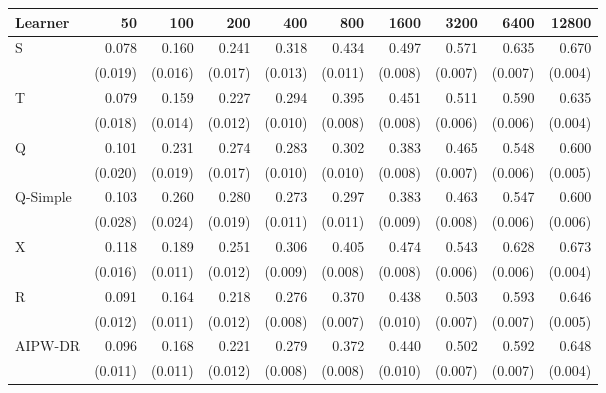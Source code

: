 \begin{tabular}{l|rrrrrrrrr}
\hline
Learner & 50 & 100 & 200 & 400 & 800 & 1600 & 3200 & 6400 & 12800 \\
\hline
S & 0.078 & 0.160 & 0.241 & 0.318 & 0.434 & 0.497 & 0.571 & 0.635 & 0.670 \\
 & \scriptsize (0.019) & \scriptsize (0.016) & \scriptsize (0.017) & \scriptsize (0.013) & \scriptsize (0.011) & \scriptsize (0.008) & \scriptsize (0.007) & \scriptsize (0.007) & \scriptsize (0.004) \\[2pt]
T & 0.079 & 0.159 & 0.227 & 0.294 & 0.395 & 0.451 & 0.511 & 0.590 & 0.635 \\
 & \scriptsize (0.018) & \scriptsize (0.014) & \scriptsize (0.012) & \scriptsize (0.010) & \scriptsize (0.008) & \scriptsize (0.008) & \scriptsize (0.006) & \scriptsize (0.006) & \scriptsize (0.004) \\[2pt]
\hline
Q & 0.101 & 0.231 & 0.274 & 0.283 & 0.302 & 0.383 & 0.465 & 0.548 & 0.600 \\
 & \scriptsize (0.020) & \scriptsize (0.019) & \scriptsize (0.017) & \scriptsize (0.010) & \scriptsize (0.010) & \scriptsize (0.008) & \scriptsize (0.007) & \scriptsize (0.006) & \scriptsize (0.005) \\[2pt]
Q-Simple & 0.103 & 0.260 & 0.280 & 0.273 & 0.297 & 0.383 & 0.463 & 0.547 & 0.600 \\
 & \scriptsize (0.028) & \scriptsize (0.024) & \scriptsize (0.019) & \scriptsize (0.011) & \scriptsize (0.011) & \scriptsize (0.009) & \scriptsize (0.008) & \scriptsize (0.006) & \scriptsize (0.006) \\[2pt]
\hline
X & 0.118 & 0.189 & 0.251 & 0.306 & 0.405 & 0.474 & 0.543 & 0.628 & 0.673 \\
 & \scriptsize (0.016) & \scriptsize (0.011) & \scriptsize (0.012) & \scriptsize (0.009) & \scriptsize (0.008) & \scriptsize (0.008) & \scriptsize (0.006) & \scriptsize (0.006) & \scriptsize (0.004) \\[2pt]
R & 0.091 & 0.164 & 0.218 & 0.276 & 0.370 & 0.438 & 0.503 & 0.593 & 0.646 \\
 & \scriptsize (0.012) & \scriptsize (0.011) & \scriptsize (0.012) & \scriptsize (0.008) & \scriptsize (0.007) & \scriptsize (0.010) & \scriptsize (0.007) & \scriptsize (0.007) & \scriptsize (0.005) \\[2pt]
AIPW-DR & 0.096 & 0.168 & 0.221 & 0.279 & 0.372 & 0.440 & 0.502 & 0.592 & 0.648 \\
 & \scriptsize (0.011) & \scriptsize (0.011) & \scriptsize (0.012) & \scriptsize (0.008) & \scriptsize (0.008) & \scriptsize (0.010) & \scriptsize (0.007) & \scriptsize (0.007) & \scriptsize (0.004) \\[2pt]

\end{tabular}
